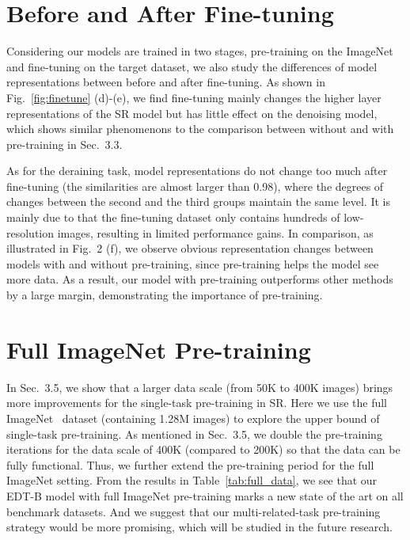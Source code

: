 \documentclass[runningheads]{llncs}
\begin{document}
	\section{Before and After Fine-tuning}
	
Considering our models are trained in two stages, pre-training on the ImageNet and fine-tuning on the target dataset, we also study the differences of model representations between before and after fine-tuning. As shown in Fig.~\ref{fig:finetune} (d)-(e), we find fine-tuning mainly changes the higher layer representations of the SR model but has little effect on the denoising model, which shows similar phenomenons to the comparison between without and with pre-training in Sec.~{3.3}. 
	
	As for the deraining task, model representations do not change too much after fine-tuning (the similarities are almost larger than 0.98), where the degrees of changes between the second and the third groups maintain the same level. It is mainly due to that the fine-tuning dataset only contains hundreds of low-resolution images, resulting in limited performance gains. In comparison, as illustrated in Fig.~{2} (f), we observe obvious representation changes between models with and without pre-training, since pre-training helps the model see more data. As a result, our model with pre-training outperforms other methods by a large margin, demonstrating the importance of pre-training.
	
	






	\section{Full ImageNet Pre-training}
	
	In Sec.~{3.5}, we show that a larger data scale (from 50K to 400K images) brings more improvements for the single-task pre-training in SR. Here we use the full ImageNet~\cite{deng2009imagenet} dataset  (containing 1.28M images) to explore the upper bound of single-task pre-training. As mentioned in Sec.~{3.5}, we double the pre-training iterations for the data scale of 400K (compared to 200K) so that the data can be fully functional. Thus, we further extend the pre-training period for the full ImageNet setting. From the results in Table~\ref{tab:full_data}, we see that our EDT-B model with full ImageNet pre-training marks a new state of the art on all benchmark datasets. And we suggest that our multi-related-task pre-training strategy would be more promising, which will be studied in the future research.
	
\end{document}
